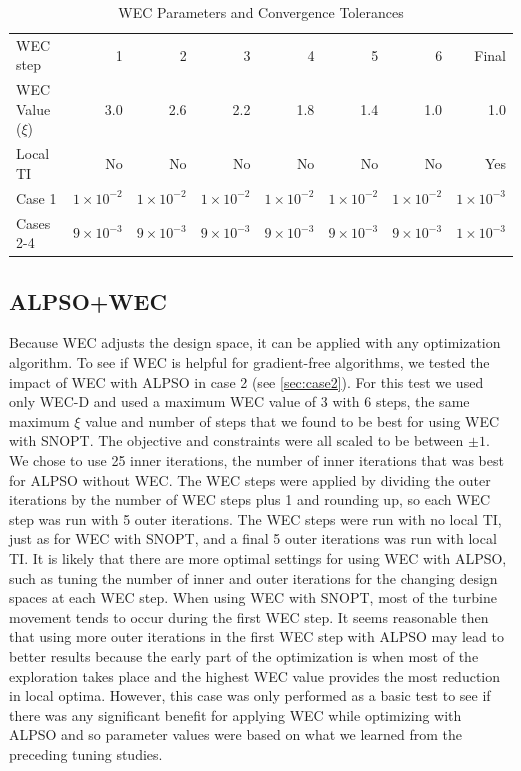 \documentclass{jpconf}
\begin{document}
\begin{table}[h!]
	\centering
	\caption{WEC Parameters and Convergence Tolerances}
	\label{tab:wectols}
	\begin{tabular}{lrrrrrrr}
		\toprule		
	WEC step & 1 & 2 & 3 & 4 & 5 & 6 & Final \\
	\cmidrule{2-8}
	WEC Value ($\xi$) & 3.0 & 2.6 & 2.2 & 1.8 & 1.4 & 1.0 & 1.0 \\
	Local TI & No & No & No & No & No & No & Yes \\
	Case 1 &	$1\times10^{-2}$ & $1\times10^{-2}$ & $1\times10^{-2}$ & $1\times10^{-2}$ & $1\times10^{-2}$ & $1\times10^{-2}$ & $1\times10^{-3}$ \\
	Cases 2-4 &	$9\times10^{-3}$ & $9\times10^{-3}$ & $9\times10^{-3}$ & $9\times10^{-3}$ & $9\times10^{-3}$ & $9\times10^{-3}$ & $1\times10^{-3}$ \\
		\bottomrule
	\end{tabular}
\end{table}

\subsection{ALPSO+WEC}
Because WEC adjusts the design space, it can be applied with any optimization algorithm. To see if WEC is helpful for gradient-free algorithms, we tested the impact of WEC with ALPSO in case 2 (see \cref{sec:case2}). For this test we used only WEC-D and used a maximum WEC value of 3 with 6 steps, the same maximum $\xi$ value and number of steps that we found to be best for using WEC with SNOPT. The objective and constraints were all scaled to be between $\pm1$. We chose to use 25 inner iterations, the number of inner iterations that was best for ALPSO without WEC. The WEC steps were applied by dividing the outer iterations by the number of WEC steps plus 1 and rounding up, so each WEC step was run with 5 outer iterations. The WEC steps were run with no local TI, just as for WEC with SNOPT, and a final 5 outer iterations was run with local TI. It is likely that there are more optimal settings for using WEC with ALPSO, such as tuning the number of inner and outer iterations for the changing design spaces at each WEC step. When using WEC with SNOPT, most of the turbine movement tends to occur during the first WEC step. It seems reasonable then that using more outer iterations in the first WEC step with ALPSO may lead to better results because the early part of the optimization is when most of the exploration takes place and the highest WEC value provides the most reduction in local optima. However, this case was only performed as a basic test to see if there was any significant benefit for applying WEC while optimizing with ALPSO and so parameter values were based on what we learned from the preceding tuning studies.
\end{document}
